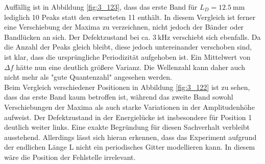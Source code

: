 Auffällig ist in Abbildung \ref{fig:3_123}, dass das erste Band für $L_D=\SI{12.5}{\milli\meter}$ lediglich 10 Peaks statt den erwarteten 11 enthält. In diesem Vergleich ist ferner eine Verschiebung der Maxima zu verzeichnen, nicht jedoch der Bänder oder Bandlücken an sich. Der Defektzustand bei ca. $\SI{3}{\kilo\hertz}$ verschiebt sich ebenfalls. Da die Anzahl der Peaks gleich bleibt, diese jedoch untereinander verschoben sind, ist klar, dass die ursprüngliche Periodizität aufgehoben ist. Ein Mittelwert von $\Delta f$ hätte nun eine deutlich größere Varianz. Die Wellenzahl kann daher auch nicht mehr als "gute Quantenzahl" angesehen werden. \\
Beim Vergleich verschiedener Positionen in Abbildung \ref{fig:3_122} ist zu sehen, dass das erste Band kaum betroffen ist, während das zweite Band sowohl Verschiebungen der Maxima als auch starke Variationen in der Amplitudenhöhe aufweist. Der Defektzustand in der Energielücke ist insbesondere für Position 1 deutlich weiter links. Eine exakte Begründung für diesen Sachverhalt verbleibt ausstehend. Allerdings lässt sich hieran erkennen, dass das Experiment aufgrund der endlichen Länge L nicht ein periodisches Gitter modellieren kann. In diesem wäre die Position der Fehlstelle irrelevant.



